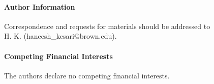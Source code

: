\documentclass[12pt,onecolumn]{article}
\begin{document}
\begin{bibunit}
\paragraph{Author Information} Correspondence and requests for materials should be addressed to \\ H. K. (haneesh\_kesari@brown.edu).

\paragraph{Competing Financial Interests} The authors declare no competing financial interests.

\putbib[refs]
% 


\end{bibunit}







\end{document}
